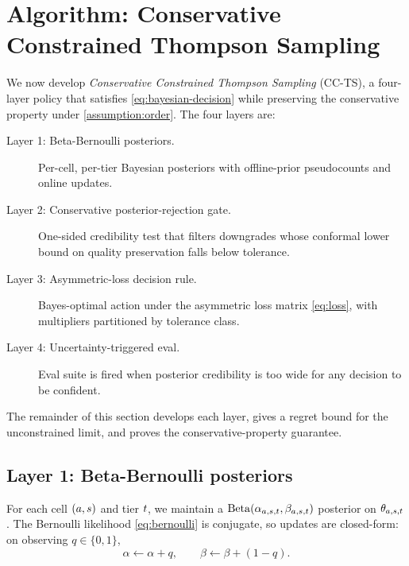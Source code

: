 \section{Algorithm: Conservative Constrained Thompson Sampling}
\label{sec:algorithm}

We now develop \emph{Conservative Constrained Thompson Sampling} (CC-TS), a
four-layer policy that satisfies \cref{eq:bayesian-decision} while preserving
the conservative property under \cref{assumption:order}. The four layers are:

\begin{description}
  \item[Layer 1: Beta-Bernoulli posteriors.] Per-cell, per-tier Bayesian
        posteriors with offline-prior pseudocounts and online updates.
  \item[Layer 2: Conservative posterior-rejection gate.] One-sided
        credibility test that filters downgrades whose conformal lower bound
        on quality preservation falls below tolerance.
  \item[Layer 3: Asymmetric-loss decision rule.] Bayes-optimal action under
        the asymmetric loss matrix \cref{eq:loss}, with multipliers
        partitioned by tolerance class.
  \item[Layer 4: Uncertainty-triggered eval.] Eval suite is fired when
        posterior credibility is too wide for any decision to be confident.
\end{description}

The remainder of this section develops each layer, gives a regret bound for
the unconstrained limit, and proves the conservative-property guarantee.

\subsection{Layer 1: Beta-Bernoulli posteriors}
\label{sec:layer1}

For each cell $(a, s)$ and tier $t$, we maintain a
$\mathrm{Beta}(\alpha_{a,s,t}, \beta_{a,s,t})$
posterior on $\theta_{a,s,t}$. The Bernoulli likelihood
\cref{eq:bernoulli} is conjugate, so updates are closed-form: on observing
$q \in \{0,1\}$,
\[
  \alpha \leftarrow \alpha + q,
  \qquad
  \beta \leftarrow \beta + (1 - q).
\]


